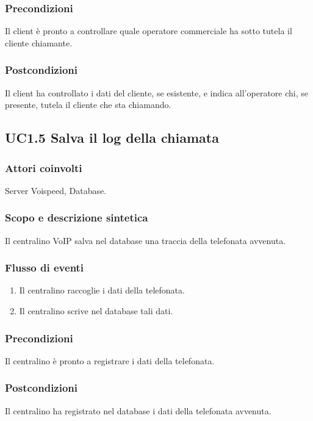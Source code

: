 \subsubsection*{Precondizioni} Il client \`e pronto a controllare quale operatore commerciale ha sotto tutela il cliente chiamante.
\subsubsection*{Postcondizioni} Il client ha controllato i dati del cliente, se esistente, e indica all'operatore chi, se presente, tutela il cliente che sta chiamando.

\subsection*{UC1.5 Salva il log della chiamata}
\subsubsection*{Attori coinvolti} Server Voispeed, Database.
\subsubsection*{Scopo e descrizione sintetica}
Il centralino VoIP salva nel database una traccia della telefonata avvenuta.
\subsubsection*{Flusso di eventi}
\begin{enumerate}
\item Il centralino raccoglie i dati della telefonata.
\item Il centralino scrive nel database tali dati.
\end{enumerate}
\subsubsection*{Precondizioni} Il centralino \`e pronto a registrare i dati della telefonata.
\subsubsection*{Postcondizioni} Il centralino ha registrato nel database i dati della telefonata avvenuta.

\newpage
